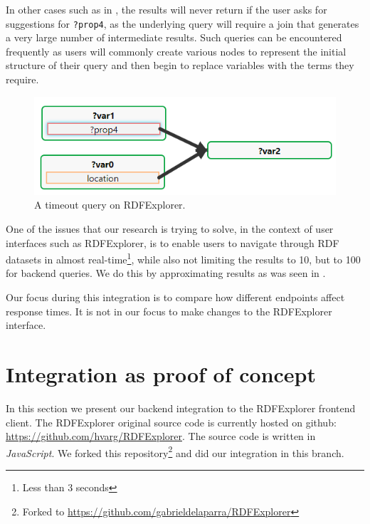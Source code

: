 In other cases such as in , the results will never return if the user asks for suggestions for \texttt{?prop4}, as the underlying query will require a join that generates a very large number of intermediate results. Such queries can be encountered frequently as users will commonly create various nodes to represent the initial structure of their query and then begin to replace variables with the terms they require. 

\begin{figure}[h]
    \centering
        \includegraphics[width=0.7\linewidth]{imagenes/timeout query.png}
        \caption{A timeout query on RDFExplorer.}
        \label{fig:rdfExplorer_timeout}
\end{figure}

One of the issues that our research is trying to solve, in the context of user interfaces such as RDFExplorer, is to enable users to navigate through RDF datasets in almost real-time\footnote{Less than 3 seconds}, while also not limiting the results to 10, but to 100 for backend queries. We do this by approximating results as was seen in .

Our focus during this integration is to compare how different endpoints affect response times. It is not in our focus to make changes to the RDFExplorer interface.


\section{Integration as proof of concept}

In this section we present our backend integration to the RDFExplorer frontend client. The RDFExplorer original source code is currently hosted on github: \url{https://github.com/hvarg/RDFExplorer}. The source code is written in \textit{JavaScript}. We forked this repository\footnote{Forked to \url{https://github.com/gabrieldelaparra/RDFExplorer}} and did our integration in this branch. 

